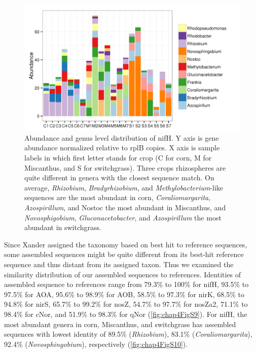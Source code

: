 \documentclass[]{msu-thesis}
\begin{document}
\begin{figure}[tbph!]
  \centering
  \includegraphics[scale=1]{figs/chap4-xander-nifH-genus-rep}
  \caption[Abundance and genus level distribution of nifH]{Abundance and genus level distribution of nifH. Y axis is gene abundance normalized relative to rplB copies. X axis is sample labels in which first letter stands for crop (C for corn, M for Miscanthus, and S for switchgrass). Three crops rhizospheres are quite different in genera with the closest sequence match. On average, \textit{Rhizobium}, \textit{Bradyrhizobium}, and \textit{Methylobacterium}-like sequences are the most abundant in corn, \textit{Coraliomargarita}, \textit{Azospirillum}, and Nostoc the most abundant in Miscanthus, and \textit{Novosphigobium}, \textit{Gluconacetobacter}, and \textit{Azospirillum} the most abundant in switchgrass.}
  \label{fig:chap4Fig6}
\end{figure}


Since Xander assigned the taxonomy based on best hit to reference sequences, some assembled sequences might be quite different from its best-hit reference sequence and thus distant from its assigned taxon. Thus we examined the similarity distribution of our assembled sequences to references. Identities of assembled sequence to references range from 79.3\% to 100\% for nifH, 93.5\% to 97.5\% for AOA, 95.6\% to 98.9\% for AOB, 58.5\% to 97.3\% for nirK, 68.5\% to 94.8\% for nirS, 65.7\% to 99.2\% for nosZ, 54.7\% to 97.7\% for nosZa2, 71.1\% to 98.4\% for cNor, and 51.9\% to 98.3\% for qNor (\cref{fig:chap4FigS9}). For nifH, the most abundant genera in corn, Miscanthus, and switchgrass has assembled sequences with lowest identity of 89.5\% (\textit{Rhizobium}), 83.1\% (\textit{Coraliomargarita}), 92.4\% (\textit{Novosphingobium}), respectively (\cref{fig:chap4FigS10}).
\end{document}
